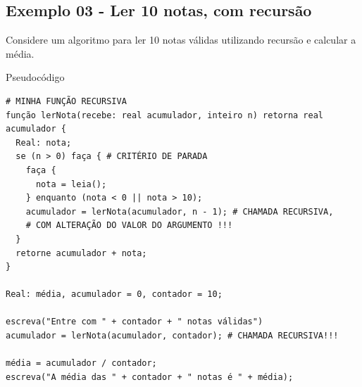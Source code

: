 \documentclass[12pt,a4paper]{article}
\begin{document}
    \hypertarget{exemplo-03---ler-10-notas-com-recursuxe3o}{%
\subsection{Exemplo 03 - Ler 10 notas, com
recursão}\label{exemplo-03---ler-10-notas-com-recursuxe3o}}

Considere um algoritmo para ler 10 notas válidas utilizando recursão e
calcular a média.

    Pseudocódigo

\begin{verbatim}
# MINHA FUNÇÃO RECURSIVA
função lerNota(recebe: real acumulador, inteiro n) retorna real acumulador {
  Real: nota;
  se (n > 0) faça { # CRITÉRIO DE PARADA
    faça {
      nota = leia();
    } enquanto (nota < 0 || nota > 10);
    acumulador = lerNota(acumulador, n - 1); # CHAMADA RECURSIVA,
    # COM ALTERAÇÃO DO VALOR DO ARGUMENTO !!!
  }
  retorne acumulador + nota;
}

Real: média, acumulador = 0, contador = 10;

escreva("Entre com " + contador + " notas válidas")
acumulador = lerNota(acumulador, contador); # CHAMADA RECURSIVA!!!

média = acumulador / contador;
escreva("A média das " + contador + " notas é " + média);
\end{verbatim}
\end{document}
